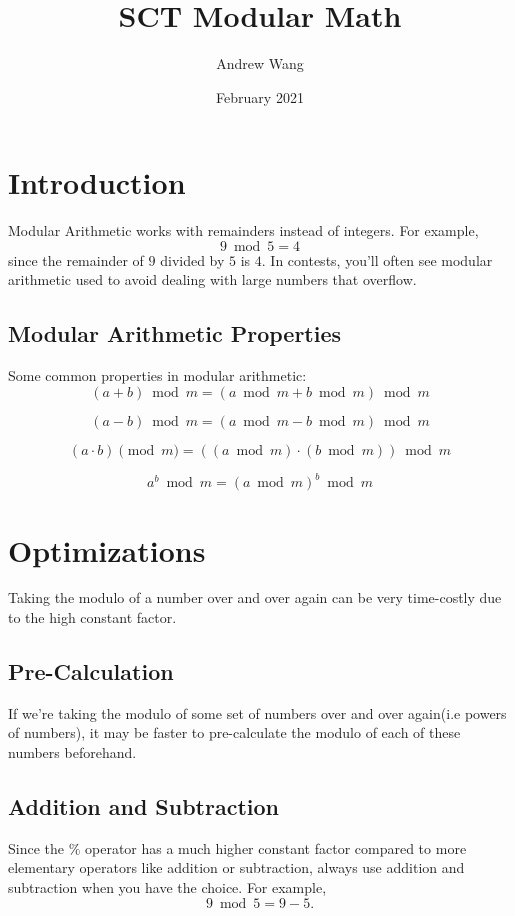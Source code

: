 \documentclass{article}
\title{SCT Modular Math}
\author{Andrew Wang}
\date{February 2021}
\begin{document}
\maketitle

\section{Introduction}
    \hspace{1em} \quad Modular Arithmetic works with remainders instead of integers. For example,
    $$
    9 \bmod 5 = 4
    $$
    since the remainder of $9$ divided by $5$ is $4$.
    In contests, you'll often see modular arithmetic used to avoid dealing with large numbers that overflow. 
\subsection{Modular Arithmetic Properties}
    \hspace{1em} \quad Some common properties in modular arithmetic:
        $$
        (a+b) \bmod m = (a \bmod m + b \bmod m) \bmod m
        $$
        
        $$
        (a-b) \bmod m = (a \bmod m - b \bmod m) \bmod m
        $$
        
        $$
        (a \cdot b) \pmod{m} = ((a \bmod m) \cdot (b \bmod m)) \bmod m
        $$
        
        $$
        a^b \bmod {m} = (a \bmod m)^b \bmod m
        $$
\section{Optimizations}
    \hspace{1em} \quad Taking the modulo of a number over and over again can be very time-costly due to the high constant factor.
    \subsection{Pre-Calculation}
        \hspace{1em} \quad If we're taking the modulo of some set of numbers over and over again(i.e powers of numbers), it may be faster to pre-calculate the modulo of each of these numbers beforehand.
    \subsection{Addition and Subtraction}
        \hspace{1em} \quad Since the $\%$ operator has a much higher constant factor compared to more elementary operators like addition or subtraction, always use addition and subtraction when you have the choice. For example,
        $$
            9 \bmod 5 = 9-5.
        $$
\end{document}
